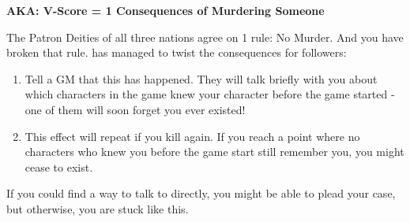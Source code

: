 \documentclass[green]{GL2020}
\begin{document}
\name{\gMurderChup{}}

\textbf{AKA: V-Score = 1 Consequences of Murdering Someone}

The Patron Deities of all three nations agree on 1 rule: No Murder. And you have broken that rule. \cGenesis{} has managed to twist the consequences for \cGenesis{\their} followers:

\begin{enumerate}
  \item Tell a GM that this has happened. They will talk briefly with you about which characters in the game knew your character before the game started - one of them will soon forget you ever existed!
  \item This effect will repeat if you kill again. If you reach a point where no characters who knew you before the game start still remember you, you might cease to exist.
\end{enumerate}

If you could find a way to talk to \cGenesis{} directly, you might be able to plead your case, but otherwise, you are stuck like this.
\end{document}
